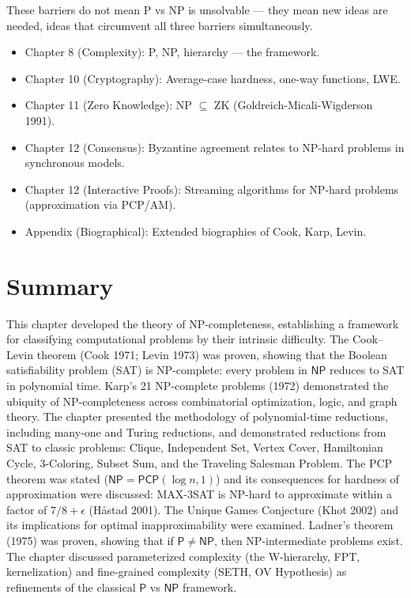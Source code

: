 These barriers do not mean P vs NP is unsolvable — they mean new ideas are needed, ideas that circumvent all three barriers simultaneously.

\begin{itemize}
\item Chapter 8 (Complexity): P, NP, hierarchy — the framework.
\item Chapter 10 (Cryptography): Average-case hardness, one-way functions, LWE.
\item Chapter 11 (Zero Knowledge): NP $\subseteq$ ZK (Goldreich-Micali-Wigderson 1991).
\item Chapter 12 (Consensus): Byzantine agreement relates to NP-hard problems in synchronous models.
\item Chapter 12 (Interactive Proofs): Streaming algorithms for NP-hard problems (approximation via PCP/AM).
\item Appendix (Biographical): Extended biographies of Cook, Karp, Levin.
\end{itemize}

\section{Summary}
\label{sec:np:summary}

This chapter developed the theory of NP-completeness, establishing a framework for classifying computational problems by their intrinsic difficulty. The Cook--Levin theorem (Cook 1971; Levin 1973) was proven, showing that the Boolean satisfiability problem (SAT) is NP-complete: every problem in $\mathsf{NP}$ reduces to SAT in polynomial time. Karp's 21 NP-complete problems (1972) demonstrated the ubiquity of NP-completeness across combinatorial optimization, logic, and graph theory. The chapter presented the methodology of polynomial-time reductions, including many-one and Turing reductions, and demonstrated reductions from SAT to classic problems: Clique, Independent Set, Vertex Cover, Hamiltonian Cycle, 3-Coloring, Subset Sum, and the Traveling Salesman Problem. The PCP theorem was stated ($\mathsf{NP} = \mathsf{PCP}(\log n, 1)$) and its consequences for hardness of approximation were discussed: MAX-3SAT is NP-hard to approximate within a factor of $7/8 + \epsilon$ (Håstad 2001). The Unique Games Conjecture (Khot 2002) and its implications for optimal inapproximability were examined. Ladner's theorem (1975) was proven, showing that if $\mathsf{P} \neq \mathsf{NP}$, then NP-intermediate problems exist. The chapter discussed parameterized complexity (the W-hierarchy, FPT, kernelization) and fine-grained complexity (SETH, OV Hypothesis) as refinements of the classical $\mathsf{P}$ vs $\mathsf{NP}$ framework.

